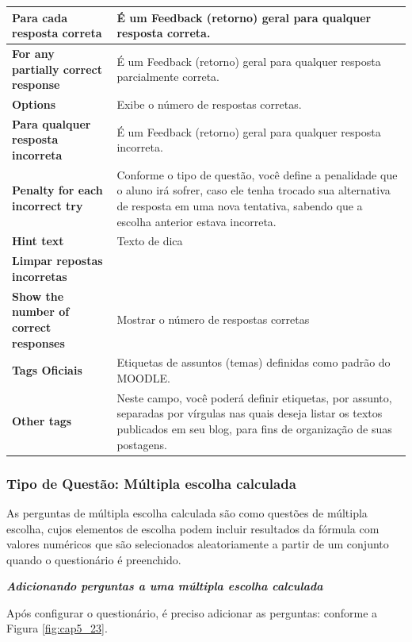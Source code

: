 \begin{longtable}{p{6cm}|p{9cm}}
    \textbf{Para cada resposta correta} & É um Feedback (retorno) geral para qualquer resposta correta.\\\hline
    \textbf{For any partially correct response} &É um Feedback (retorno) geral para qualquer resposta parcialmente correta. \\\hline
    \textbf{Options} & Exibe o número de respostas corretas. \\\hline
    \textbf{Para qualquer resposta incorreta} & É um Feedback (retorno) geral para qualquer resposta incorreta. \\\hline
    \textbf{Penalty for each incorrect try} & Conforme o tipo de questão, você define a  penalidade que o aluno irá sofrer, caso ele tenha trocado sua  alternativa de resposta em uma nova tentativa, sabendo que a escolha anterior estava incorreta.  \\\hline
    \textbf{Hint text} & Texto de dica \\\hline
    \textbf{Limpar repostas incorretas} &         \\\hline
    \textbf{Show the number of correct responses} & Mostrar o número de respostas corretas \\\hline
    \textbf{Tags Oficiais} & Etiquetas de assuntos (temas) definidas como padrão do MOODLE. \\\hline
    \textbf{Other tags} &  Neste campo,  você poderá definir  etiquetas,  por assunto, separadas por vírgulas nas quais deseja listar os textos publicados em seu blog, para fins de organização de suas postagens. \\\hline
\end{longtable}%

\subsubsection{Tipo de Questão: Múltipla escolha calculada}
As perguntas de múltipla escolha calculada são como questões de múltipla escolha, cujos elementos de escolha podem incluir resultados da fórmula com valores numéricos que são selecionados aleatoriamente a partir de um conjunto quando o questionário é preenchido.

 \textit{\textbf{Adicionando perguntas a uma múltipla escolha calculada}}

Após configurar o questionário, é preciso adicionar as perguntas: conforme a Figura \ref{fig:cap5_23}.

